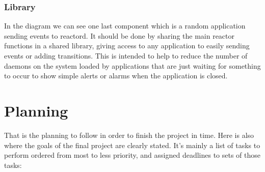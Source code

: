 \documentclass[a4paper,11pt]{article}
\begin{document}
\subsubsection{Library}
In the diagram we can see one last component which is a random application sending events to reactord. It 
should be done by sharing the main reactor functions in a shared library, giving access to any application 
to easily sending events or adding transitions. This is intended to help to reduce the number of daemons on 
the system loaded by applications that are just waiting for something to occur to show simple alerts or 
alarms when the application is closed.

  
\section{Planning}
That is the planning to follow in order to finish the project in time. 
Here is also where the goals of the final project are clearly 
stated. It's mainly a list of tasks to perform ordered from most to less 
priority, and assigned deadlines to sets of those tasks:
\small
\end{document}
